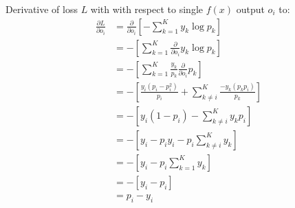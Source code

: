 Derivative of loss $L$ with with respect to single $f(x)$ output $o_i$ to:\\
\begin{align*}
    \frac{\partial L}{\partial o_i} &= \frac{\partial}{\partial o_i} \left[- \sum^K_{k=1} y_k \log p_k \right]\\
    &= - \left[\sum^K_{k=1} \frac{\partial}{\partial o_i} y_k \log p_k \right]\\
    &= - \left[\sum^K_{k=1} \frac{y_k}{p_k} \frac{\partial}{\partial o_i}  p_k \right]\\
    &= - \left[ \frac{y_i (p_i - p_i^2)}{p_i} + \sum^K_{k\neq i} \frac{-y_k(p_kp_i)}{p_k} \right]\\
    &= - \left[ y_i (1-p_i) - \sum^K_{k\neq i} y_k p_i \right]\\
    &= - \left[ y_i - p_iy_i - p_i\sum^K_{k\neq i} y_k \right]\\
    &= - \left[ y_i - p_i\sum^K_{k=1} y_k \right]\\
    &= - \left[ y_i - p_i \right]\\
    &=  p_i - y_i\\
\end{align*}
